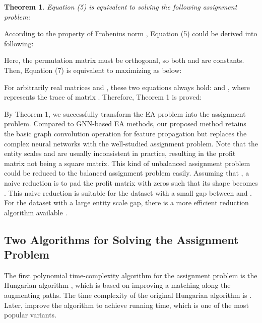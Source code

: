 \documentclass[11pt]{article}
\newtheorem{theorem}{Theorem}
\newenvironment{proof}{{\noindent\it Proof:\quad}}{\hfill \par}
\begin{document}
\begin{theorem}
Equation (5) is equivalent to solving the following assignment problem:
\begin{small}

\end{small}
\end{theorem}

\begin{proof}
According to the property of Frobenius norm , Equation (5) could be derived into following:
\begin{small}

\end{small}
Here, the permutation matrix  must be orthogonal, so both  and  are constants.
Then, Equation (7) is equivalent to maximizing as below:
\begin{small}

\end{small}
For arbitrarily real matrices  and , these two equations always hold:  and , where  represents the trace of matrix .
Therefore, Theorem 1 is proved:

\begin{small}

\end{small}
\end{proof}

By Theorem 1, we successfully transform the EA problem into the assignment problem.
Compared to GNN-based EA methods, our proposed method retains the basic graph convolution operation for feature propagation but replaces the complex neural networks with the well-studied assignment problem.
Note that the entity scales  and  are usually inconsistent in practice, resulting in the profit matrix not being a square matrix.
This kind of unbalanced assignment problem could be reduced to the balanced assignment problem easily.
Assuming that , a naive reduction is to pad the profit matrix with zeros such that its shape becomes .
This naive reduction is suitable for the dataset with a small gap between  and .
For the dataset with a large entity scale gap, there is a more efficient reduction algorithm available \cite{ramshaw2012minimum}.

\subsection{Two Algorithms for Solving the Assignment Problem}
\label{sec:SAP}
The first polynomial time-complexity algorithm for the assignment problem is the Hungarian algorithm \cite{kuhn1955hungarian}, which is based on improving a matching along the augmenting paths.
The time complexity of the original Hungarian algorithm is .
Later, \citet{DBLP:journals/computing/JonkerV87} improve the algorithm to achieve  running time, which is one of the most popular variants.
\end{document}
